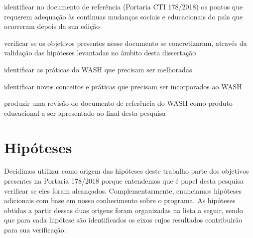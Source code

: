 \documentclass[
12pt,		%
openright,	%
twoside,  %
a4paper,			%
chapter=TITLE,		%
english,			%
french,				%
spanish,			%
brazil				%
]{USPSC-classe/USPSC}
\begin{document}
\begin{alineas}
\item identificar no documento de refer\^encia (Portaria CTI 178/2018) os pontos que requerem adequa\c{c}\~ao \`as cont\'{\i}nuas mudan\c{c}as sociais e educacionais do pa\'{\i}s que ocorreram depois da sua edi\c{c}\~ao
\item verificar se os objetivos presentes nesse documento se concretizaram, atrav\'es da valida\c{c}\~ao das hip\'oteses levantadas no \^ambito desta disserta\c{c}\~ao
\item identificar as pr\'aticas do WASH que precisam ser melhoradas
\item identificar novos conceitos e pr\'aticas que precisam ser incorporados ao WASH
\item produzir uma revis\~ao do documento de refer\^encia do WASH como produto educacional a ser apresentado ao final desta pesquisa
\end{alineas}

\section[Hip\'oteses]{Hip\'oteses}\label{Hip\'oteses}
Decidimos utilizar como origem das hip\'oteses deste trabalho parte dos objetivos presentes na Portaria 178/2018 porque entendemos que \'e papel desta pesquisa verificar se eles foram alcan\c{c}ados. Complementarmente, enunciamos hip\'oteses adicionais com base em nosso conhecimento sobre o programa. As hip\'oteses obtidas a partir dessas duas origens foram organizadas na lista a seguir, sendo que para cada hip\'otese s\~ao identificados os eixos cujos resultados contribuir\~ao para sua verifica\c{c}\~ao:
\end{document}

